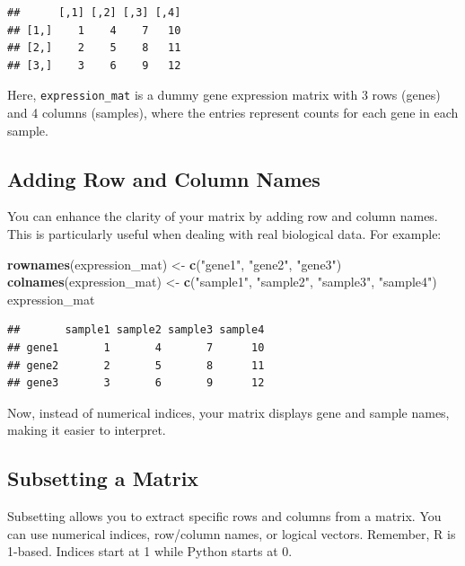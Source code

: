 \documentclass[
]{book}
\newenvironment{Shaded}{\begin{snugshade}}{\end{snugshade}}
\newcommand{\FunctionTok}[1]{\textcolor[rgb]{0.13,0.29,0.53}{\textbf{#1}}}
\newcommand{\NormalTok}[1]{#1}
\newcommand{\OtherTok}[1]{\textcolor[rgb]{0.56,0.35,0.01}{#1}}
\newcommand{\StringTok}[1]{\textcolor[rgb]{0.31,0.60,0.02}{#1}}
\begin{document}
\begin{verbatim}
##      [,1] [,2] [,3] [,4]
## [1,]    1    4    7   10
## [2,]    2    5    8   11
## [3,]    3    6    9   12
\end{verbatim}

Here, \texttt{expression\_mat} is a dummy gene expression matrix with 3 rows (genes) and 4 columns (samples), where the entries represent counts for each gene in each sample.

\hypertarget{adding-row-and-column-names}{%
\subsection{Adding Row and Column Names}\label{adding-row-and-column-names}}

You can enhance the clarity of your matrix by adding row and column names. This is particularly useful when dealing with real biological data. For example:

\begin{Shaded}
\begin{Highlighting}[]
\FunctionTok{rownames}\NormalTok{(expression\_mat) }\OtherTok{\textless{}{-}} \FunctionTok{c}\NormalTok{(}\StringTok{"gene1"}\NormalTok{, }\StringTok{"gene2"}\NormalTok{, }\StringTok{"gene3"}\NormalTok{)}
\FunctionTok{colnames}\NormalTok{(expression\_mat) }\OtherTok{\textless{}{-}} \FunctionTok{c}\NormalTok{(}\StringTok{"sample1"}\NormalTok{, }\StringTok{"sample2"}\NormalTok{, }\StringTok{"sample3"}\NormalTok{, }\StringTok{"sample4"}\NormalTok{)}
\NormalTok{expression\_mat}
\end{Highlighting}
\end{Shaded}

\begin{verbatim}
##       sample1 sample2 sample3 sample4
## gene1       1       4       7      10
## gene2       2       5       8      11
## gene3       3       6       9      12
\end{verbatim}

Now, instead of numerical indices, your matrix displays gene and sample names, making it easier to interpret.

\hypertarget{subsetting-a-matrix}{%
\subsection{Subsetting a Matrix}\label{subsetting-a-matrix}}

Subsetting allows you to extract specific rows and columns from a matrix. You can use numerical indices, row/column names, or logical vectors. Remember, R is 1-based. Indices start at 1 while Python starts at 0.
\end{document}
